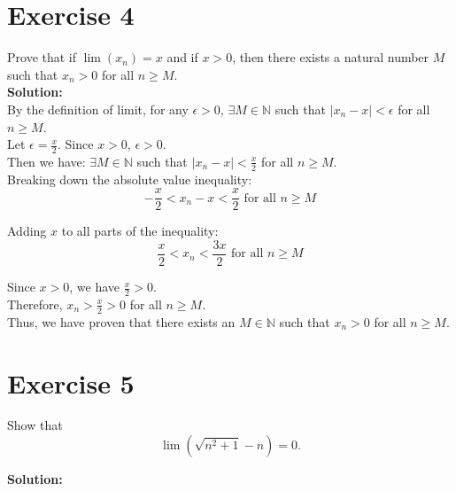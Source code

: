 \documentclass{article}
\begin{document}
\newpage

\section*{Exercise 4}
Prove that if $\lim(x_n) = x$ and if $x > 0$, then there exists a natural number $M$ such that $x_n > 0$ for all $n \geq M$. \\

\textbf{Solution:} \\

By the definition of limit, for any $\epsilon > 0$, 
$\exists M \in \mathbb{N}$ such that $|x_n - x| < \epsilon$ for all $n \geq M$. \\

Let $\epsilon = \frac{x}{2}$. Since $x > 0$, $\epsilon > 0$. \\

Then we have:
$\exists M \in \mathbb{N}$ such that $|x_n - x| < \frac{x}{2}$ for all $n \geq M$. \\

Breaking down the absolute value inequality:
$$-\frac{x}{2} < x_n - x < \frac{x}{2} \text{ for all } n \geq M$$

Adding $x$ to all parts of the inequality:
$$\frac{x}{2} < x_n < \frac{3x}{2} \text{ for all } n \geq M$$

Since $x > 0$, we have $\frac{x}{2} > 0$. \\

Therefore, $x_n > \frac{x}{2} > 0$ for all $n \geq M$. \\

Thus, we have proven that there exists an $M \in \mathbb{N}$ such that $x_n > 0$ for all $n \geq M$.

\newpage

\section*{Exercise 5}
Show that
\[\lim\left(\sqrt{n^2 + 1} - n\right) = 0.\]

\textbf{Solution:} \\
\end{document}
